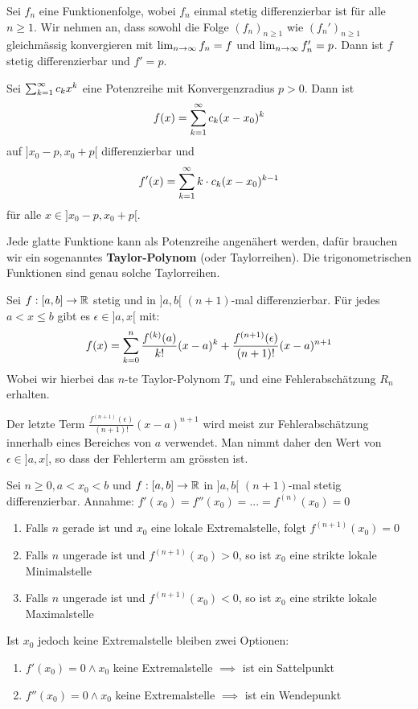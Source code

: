 
\Satz Sei $f_n$ eine Funktionenfolge, wobei $f_n$ einmal stetig differenzierbar ist für alle 
$n \geq 1$. Wir nehmen an, dass sowohl die Folge $(f_n)_{n \geq 1}$ wie $(f_n')_{n \geq 1}$ 
gleichmässig konvergieren mit $\lim_{n \rightarrow \infty} f_n = f$ und $\lim_{n \rightarrow \infty} f_n' = p$. Dann ist $f$ stetig 
differenzierbar und $f' = p$.

\begin{tcolorbox}
    \Satz Sei $\sum_{k = 1}^{\infty} c_k x^k$ eine Potenzreihe mit Konvergenzradius $p > 0$. Dann ist 
    $$f(x) = \sum_{k = 1}^{\infty} c_k (x - x_0)^k$$
    auf $]x_0 - p, x_0 + p[$ differenzierbar und
    $$f'(x) = \sum_{k = 1}^{\infty} k \cdot c_k (x - x_0)^{k-1}$$
    für alle $x \in ]x_0 - p, x_0 + p[$.
\end{tcolorbox}


\columnbreak



Jede glatte Funktione kann als Potenzreihe angenähert werden, dafür brauchen wir ein sogenanntes
\textbf{Taylor-Polynom} (oder Taylorreihen). Die trigonometrischen Funktionen sind genau solche 
Taylorreihen.

\begin{tcolorbox}
    Sei $f : [a,b] \to \mathbb{R}$ stetig und in $]a,b[$ $(n+1)$-mal differenzierbar. Für jedes $a < x \leq b$
    gibt es $\epsilon \in ]a,x[$ mit:
    $$f(x) = \sum\limits_{k = 0}^{n} \frac{f^{(k)}(a)}{k!}(x - a)^k + \frac{f^{(n + 1)}(\epsilon)}{(n+1)!}(x-a)^{n+1}$$
    Wobei wir hierbei das $n$-te Taylor-Polynom $T_n$ und eine Fehlerabschätzung $R_n$ erhalten.
\end{tcolorbox}

\Bem Der letzte Term $\frac{f^{(n + 1)}(\epsilon)}{(n+1)!}(x-a)^{n+1}$ wird meist zur Fehlerabschätzung
innerhalb eines Bereiches von $a$ verwendet. Man nimmt daher den Wert von $\epsilon \in ]a,x[$, so
dass der Fehlerterm am grössten ist.



Sei $n \geq 0, a < x_0 < b$ und $f : [a,b] \to \mathbb{R}$ in $]a,b[$ $(n+1)$-mal stetig differenzierbar.
Annahme: $f'(x_0) = f''(x_0) = ... = f^{(n)}(x_0) = 0$

\begin{enumerate}[label = (\arabic*)]
    \item Falls $n$ gerade ist und $x_0$ eine lokale Extremalstelle, folgt $f^{(n+1)}(x_0) = 0$
    \item Falls $n$ ungerade ist und $f^{(n+1)}(x_0) > 0$, so ist $x_0$ eine strikte lokale Minimalstelle
    \item Falls $n$ ungerade ist und $f^{(n+1)}(x_0) < 0$, so ist $x_0$ eine strikte lokale Maximalstelle
\end{enumerate}

Ist $x_0$ jedoch keine Extremalstelle bleiben zwei Optionen:
\begin{enumerate}[label = (\arabic*)]
    \item $f'(x_0) = 0 \wedge x_0$ keine Extremalstelle $\implies$ ist ein Sattelpunkt
    \item $f''(x_0) = 0 \wedge x_0$ keine Extremalstelle $\implies$ ist ein Wendepunkt
\end{enumerate}
